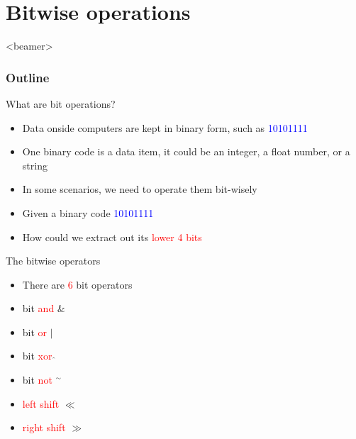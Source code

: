 \section{Bitwise operations}
\label{sec:bitwise}
\begin{frame}<beamer>
    \frametitle{Outline}
    \tableofcontents[currentsection]
\end{frame}

\begin{frame}{What are bit operations?}
\begin{itemize}
	\item {Data onside computers are kept in binary form, such as \textcolor{blue}{10101111}}
	\vspace{0.15in}
	\item {One binary code is a data item, it could be an integer, a float number, or a string}
	\vspace{0.15in}
	\item {In some scenarios, we need to operate them bit-wisely}
\end{itemize}
	\vspace{0.25in}
\begin{itemize}
	\item {Given a binary code \textcolor{blue}{10101111}}
	\vspace{0.15in}
	\item {How could we extract out its \textcolor{red}{lower 4 bits}}
\end{itemize}
\end{frame}

\begin{frame}{The bitwise operators}
\begin{itemize}
	\item {There are \textcolor{red}{6} bit operators}
	\vspace{0.15in}
	\item {bit \textcolor{red}{and} \&}
	\vspace{0.15in}
	\item {bit \textcolor{red}{or} $|$}
	\vspace{0.15in}
	\item {bit \textcolor{red}{xor} $\hat{}$}
	\vspace{0.15in}
	\item {bit \textcolor{red}{not} $^\sim$}
	\vspace{0.15in}
	\item {\textcolor{red}{left shift} $\ll$}
	\vspace{0.15in}
	\item {\textcolor{red}{right shift} $\gg$}
\end{itemize}
\end{frame}

